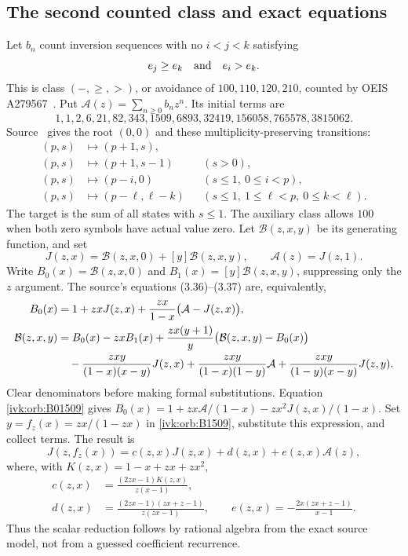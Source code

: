 \documentclass[11pt,letterpaper]{article}
\theoremstyle{remark}\newtheorem{remark}[theorem]{Remark}
\begin{document}
\subsection{The second counted class and exact equations}
Let $b_n$ count inversion sequences with no $i<j<k$ satisfying
\begin{equation}\label{ivk:orb:avoid1509}
e_j\ge e_k\quad\hbox{and}\quad e_i>e_k.
\end{equation}
This is class $(-,\ge,>)$, or avoidance of $100,110,120,210$,
counted by OEIS A279567~\cite{oeis1509}. Put
$\mathcal A(z)=\sum_{n\ge0}b_nz^n$. Its initial terms are
\[
1,1,2,6,21,82,343,1509,6893,32419,156058,765578,3815062.
\]
Source~\cite[Section 3.6, equation (3.34)]{bb} gives the root $(0,0)$
and these multiplicity-preserving transitions:
\begin{equation}\label{ivk:orb:tree1509}
\begin{aligned}
(p,s)&\longmapsto(p+1,s),\\
(p,s)&\longmapsto(p+1,s-1)&& (s>0),\\
(p,s)&\longmapsto(p-i,0)&& (s\le1,\ 0\le i<p),\\
(p,s)&\longmapsto(p-\ell,\ell-k)&&
(s\le1,\ 1\le\ell<p,\ 0\le k<\ell).
\end{aligned}
\end{equation}
The target is the sum of all states with $s\le1$. The auxiliary class
allows $100$ when both zero symbols have actual value zero. Let
$\mathcal B(z,x,y)$ be its generating function, and set
\[
J(z,x)=\mathcal B(z,x,0)+[y]\mathcal B(z,x,y),\qquad
\mathcal A(z)=J(z,1).
\]
Write $B_0(x)=\mathcal B(z,x,0)$ and $B_1(x)=[y]\mathcal B(z,x,y)$,
suppressing only the $z$ argument. The source's equations (3.36)--(3.37)
are, equivalently,
\begin{align}
B_0(x)&=1+zxJ(z,x)+\frac{zx}{1-x}\bigl(\mathcal A-J(z,x)\bigr),
\label{ivk:orb:B01509}\\
\mathcal B(z,x,y)&=B_0(x)-zxB_1(x)
+\frac{zx(y+1)}y\bigl(\mathcal B(z,x,y)-B_0(x)\bigr)\notag\\
&\quad-\frac{zxy}{(1-x)(x-y)}J(z,x)
+\frac{zxy}{(1-x)(1-y)}\mathcal A
+\frac{zxy}{(1-y)(x-y)}J(z,y).
\label{ivk:orb:B1509}
\end{align}
Clear denominators before making formal substitutions. Equation
\eqref{ivk:orb:B01509} gives
$B_0(x)=1+zx\mathcal A/(1-x)-zx^2J(z,x)/(1-x)$.
Set $y=f_z(x)=zx/(1-zx)$ in \eqref{ivk:orb:B1509}, substitute this expression,
and collect terms. The result is
\begin{equation}\label{ivk:orb:J1509}
J(z,f_z(x))=c(z,x)J(z,x)+d(z,x)+e(z,x)\mathcal A(z),
\end{equation}
where, with $K(z,x)=1-x+zx+zx^2$,
\begin{equation}\label{ivk:orb:cde1509}
\begin{aligned}
c(z,x)&=\frac{(2zx-1)K(z,x)}{z(x-1)},\\
d(z,x)&=\frac{(2zx-1)(zx+z-1)}{z(zx-1)},\qquad
e(z,x)=-\frac{2x(zx+z-1)}{x-1}.
\end{aligned}
\end{equation}
Thus the scalar reduction follows by rational algebra from the exact
source model, not from a guessed coefficient recurrence.
\end{document}
